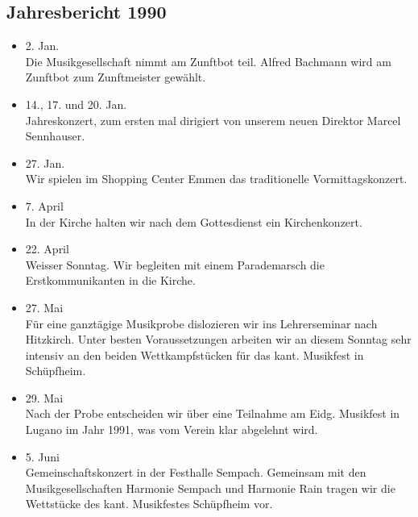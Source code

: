 \subsection{Jahresbericht 1990}

\begin{history}


    \begin{itemize}

        \item[]2. Jan.\\
        Die Musikgesellschaft nimmt am Zunftbot teil. Alfred Bachmann wird am
        Zunftbot zum Zunftmeister gewählt.

        \item[]14., 17. und 20. Jan.\\
        Jahreskonzert, zum ersten mal dirigiert von unserem neuen Direktor
        Marcel Sennhauser.

        \item[]27. Jan.\\
        Wir spielen im Shopping Center Emmen das traditionelle
        Vormittagskonzert.

        \item[]7. April\\
        In der Kirche halten wir nach dem Gottesdienst ein Kirchenkonzert.

        \item[]22. April\\
        Weisser Sonntag. Wir begleiten mit einem Parademarsch die
        Erstkommunikanten in die Kirche.

        \item[]27. Mai\\
        Für eine ganztägige Musikprobe dislozieren wir ins Lehrerseminar nach
        Hitzkirch. Unter besten Voraussetzungen arbeiten wir an diesem Sonntag
        sehr intensiv an den beiden Wettkampfstücken für das kant. Musikfest in
        Schüpfheim.

        \item[]29. Mai\\
        Nach der Probe entscheiden wir über eine Teilnahme am Eidg. Musikfest in
        Lugano im Jahr 1991, was vom Verein klar abgelehnt wird.

        \item[]5. Juni\\
        Gemeinschaftskonzert in der Festhalle Sempach. Gemeinsam mit den
        Musikgesellschaften Harmonie Sempach und Harmonie Rain tragen wir die
        Wettstücke des kant. Musikfestes Schüpfheim vor.


\end{itemize}
\end{history}

